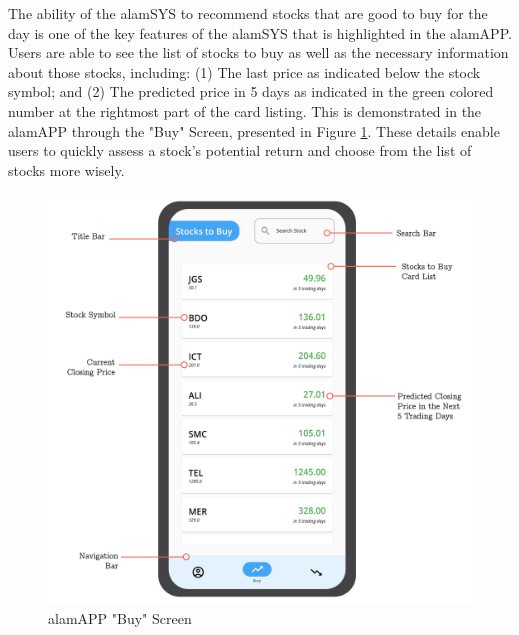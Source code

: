 The ability of the alamSYS to recommend stocks that are good to buy for the 
day is one of the key features of the alamSYS that is highlighted in the alamAPP. 
Users are able to see the list of stocks to buy as well as the necessary information 
about those stocks, including: (1) The last price as indicated below the stock symbol; 
and (2) The predicted price in 5 days as indicated in the green colored number at 
the rightmost part of the card listing. This is demonstrated in the alamAPP through 
the "Buy" Screen, presented in Figure \ref{fig:alamAPP_buy}. 
These details enable users to quickly assess a stock's potential return and choose 
from the list of stocks more wisely.
\begin{figure}[ht]
  \centering
  \includegraphics[height=0.60\textheight]{./assets/Chapter_4/mobile_ui/buy_ui.jpg}
  \caption{alamAPP "Buy" Screen}
  \label{fig:alamAPP_buy}
\end{figure}
\FloatBarrier


